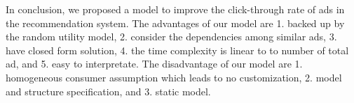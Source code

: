 \documentclass[12pt]{article}
\theoremstyle{definition}
\begin{document}
\begin{sloppypar}
In conclusion, we proposed a model to improve the click-through rate of ads in the recommendation system. The advantages of our model are 1. backed up by the random utility model, 2. consider the dependencies among similar ads, 3. have closed form solution, 4. the time complexity is linear to to number of total ad, and 5. easy to interpretate. The disadvantage of our model are 1. homogeneous consumer assumption which leads to no customization, 2. model and structure specification, and 3. static model.

\printbibliography


\end{sloppypar}
\end{document}
